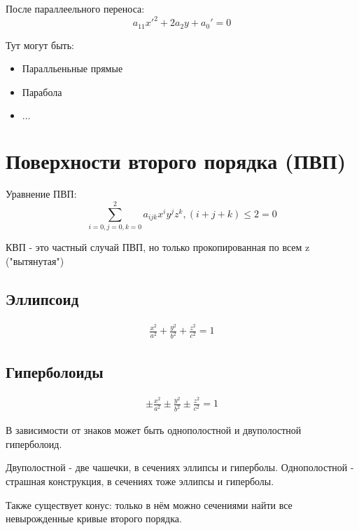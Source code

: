 \documentclass[12pt, a4paper]{article}
\begin{document}
    После параллеельного переноса:
    \begin{equation}
        a_{11} x'^2 + 2a_2 y + a_0' = 0
    \end{equation}

    Тут могут быть:
    \begin{itemize}
        \item Паралльеньные прямые
        \item Парабола
        \item $\dots$
    \end{itemize}

    \section{Поверхности второго порядка (ПВП)}

    Уравнение ПВП:
    \begin{equation}
        \sum_{i = 0, j = 0, k = 0}^{2} a_{ijk} x^i y^j z^k, (i + j + k) \leqslant 2 = 0
    \end{equation}

    \begin{note}
        КВП - это частный случай ПВП, но только прокопированная по всем z ("вытянутая")
    \end{note}

    \subsection{Эллипсоид}

    \begin{eqnarray}
        \frac{x^2}{a^2} + \frac{y^2}{b^2} + \frac{z^2}{c^2} = 1
    \end{eqnarray}

    \subsection{Гиперболоиды}

    \begin{eqnarray}
        \pm \frac{x^2}{a^2} \pm  \frac{y^2}{b^2} \pm  \frac{z^2}{c^2} = 1
    \end{eqnarray}

    В зависимости от знаков может быть однополостной и двуполостной гиперболоид.

    Двуполостной - две чашечки, в сечениях эллипсы и гиперболы.
    Однополостной - страшная конструкция, в сечениях тоже эллипсы и гиперболы.

    Также существует конус: только в нём можно сечениями найти все невырожденные кривые второго порядка.
\end{document}
